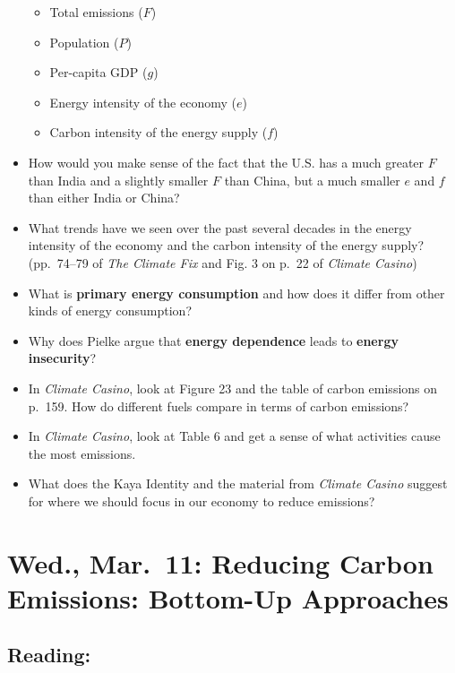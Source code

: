 \documentclass[
]{article}
\providecommand{\tightlist}{%
  \setlength{\itemsep}{0pt}\setlength{\parskip}{0pt}}
\newcommand{\COO}{\ce{CO2}}
\begin{document}
\begin{itemize}
  \begin{itemize}
  \tightlist
  \item
    Total \COO{} emissions (\(F\))
  \item
    Population (\(P\))
  \item
    Per-capita GDP (\(g\))
  \item
    Energy intensity of the economy (\(e\))
  \item
    Carbon intensity of the energy supply (\(f\))
  \end{itemize}
\item
  How would you make sense of the fact that the U.S. has a much greater
  \(F\) than India and a slightly smaller \(F\) than China, but a much
  smaller \(e\) and \(f\) than either India or China?
\item
  What trends have we seen over the past several decades in the energy
  intensity of the economy and the carbon intensity of the energy
  supply? (pp.~74--79 of \emph{The Climate Fix} and Fig. 3 on p.~22 of
  \emph{Climate Casino})
\item
  What is \textbf{primary energy consumption} and how does it differ
  from other kinds of energy consumption?
\item
  Why does Pielke argue that \textbf{energy dependence} leads to
  \textbf{energy insecurity}?
\item
  In \emph{Climate Casino}, look at Figure 23 and the table of carbon
  emissions on p.~159. How do different fuels compare in terms of carbon
  emissions?
\item
  In \emph{Climate Casino}, look at Table 6 and get a sense of what
  activities cause the most \COO{} emissions.
\item
  What does the Kaya Identity and the material from \emph{Climate
  Casino} suggest for where we should focus in our economy to reduce
  \COO{} emissions?
\end{itemize}

\hypertarget{wed.-mar.-11-reducing-carbon-emissions-bottom-up-approaches}{%
\section{Wed., Mar.~11: Reducing Carbon Emissions: Bottom-Up
Approaches}\label{wed.-mar.-11-reducing-carbon-emissions-bottom-up-approaches}}

\hypertarget{reading-24}{%
\subsection{Reading:}\label{reading-24}}
\end{document}
